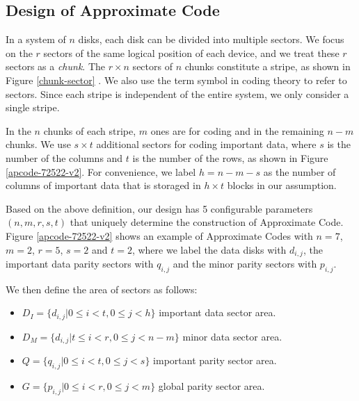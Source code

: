 \documentclass[sigconf]{acmart}
\begin{document}
\subsection{Design of Approximate Code}
In a system of $n$ disks, each disk can be divided into multiple sectors. We focus on the $r$ sectors of the same logical position of each device, and we treat these $r$ sectors as a \emph{chunk}. The $r \times n$ sectors of $n$ chunks constitute a stripe, as shown in Figure \ref{chunk-sector} . We also use the term symbol in coding theory to refer to sectors. Since each stripe is independent of the entire system, we only consider a single stripe.


In the $n$ chunks of each stripe, $m$ ones are for coding and in the remaining $n-m$ chunks. 
We use $s \times t$ additional sectors for coding important data, where $s$ is the number of the columns and $t$ is the number of the rows, as shown in Figure \ref{apcode-72522-v2}.
For convenience, we label $h=n-m-s$ as the number of columns of important data that is storaged in $h \times t$ blocks in our assumption.

Based on the above definition, our design has 5 configurable parameters $(n, m, r, s,t)$ that uniquely determine the construction of Approximate Code.
Figure \ref{apcode-72522-v2} shows an example of Approximate Codes with $n = 7$, $m = 2$, $r=5$, $s=2$ and $t = 2$, where we label the data disks with $d_{i,j}$, the important data parity sectors with $q_{i,j}$ and the minor parity sectors with $p_{i,j}$.

We then define the area of sectors as follows:
\begin{itemize}
    \item $D_I=\{d_{i,j}|0\leqslant i < t, 0\leqslant j < h \}$ important data sector area.
    \item $D_M=\{d_{i,j}|t\leqslant i < r, 0\leqslant j < n-m \}$ minor data sector area.
    \item $Q=\{q_{i,j}|0\leqslant i < t, 0\leqslant j < s \}$ important parity sector area. 
    \item $G=\{p_{i,j}|0\leqslant i < r, 0\leqslant j < m \}$ global parity sector area.
\end{itemize}
\end{document}
